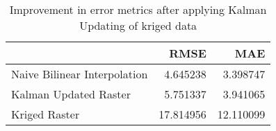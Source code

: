 \begin{table}
\caption{Improvement in error metrics after applying Kalman Updating of kriged data}
\label{tab:oahu7_gebco_raster_error}
\begin{tabular}{lrr}
\toprule
 & RMSE & MAE \\
\midrule
Naive Bilinear Interpolation & 4.645238 & 3.398747 \\
Kalman Updated Raster & 5.751337 & 3.941065 \\
Kriged Raster & 17.814956 & 12.110099 \\
\bottomrule
\end{tabular}
\end{table}
